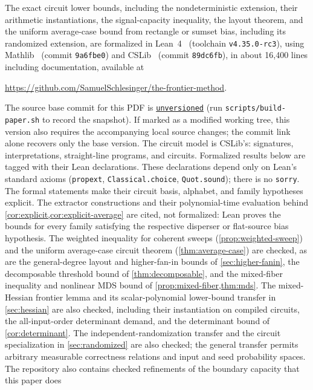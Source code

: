\documentclass[11pt]{article}
\theoremstyle{plain}
\theoremstyle{definition}
\theoremstyle{remark}
\newcommand{\artifactcommit}{main}
\newcommand{\artifactshort}{unversioned}
\newcommand{\artifactstatus}{ (run \texttt{scripts/build-paper.sh} to record the snapshot)}
\begin{document}
The exact circuit lower bounds, including the nondeterministic extension, their arithmetic
instantiations, the signal-capacity inequality, the layout theorem, and the uniform
average-case bound from rectangle or sumset bias, including its randomized extension, are
formalized in Lean~4~\cite{Lean4} (toolchain \texttt{v4.35.0-rc3}),
using Mathlib~\cite{Mathlib} (commit \texttt{9a6fbe0}) and CSLib~\cite{CSLib} (commit
\texttt{89dc6fb}), in about 16,400 lines including documentation, available at
\begin{center}
\url{https://github.com/SamuelSchlesinger/the-frontier-method}.
\end{center}
The source base commit for this PDF is
\href{https://github.com/SamuelSchlesinger/the-frontier-method/tree/\artifactcommit}{\texttt{\artifactshort}}\artifactstatus.
If marked as a modified working tree, this version also requires the accompanying local
source changes; the commit link alone recovers only the base version.
The circuit model is CSLib's: signatures, interpretations, straight-line programs, and circuits.
Formalized results below are tagged with their Lean declarations. These declarations
depend only on Lean's standard axioms (\texttt{propext},
\texttt{Classical.choice}, \texttt{Quot.sound}); there is no \texttt{sorry}. The formal
statements make their circuit basis, alphabet, and family hypotheses explicit.
The extractor constructions and their
polynomial-time evaluation behind \cref{cor:explicit,cor:explicit-average} are cited, not
formalized: Lean proves the bounds for every family satisfying the respective disperser or
flat-source bias hypothesis. The weighted inequality for coherent sweeps
(\cref{prop:weighted-sweep}) and the uniform average-case circuit theorem
(\cref{thm:average-case}) are checked, as are the general-degree layout and higher-fan-in
bounds of \cref{sec:higher-fanin}, the decomposable threshold bound of \cref{thm:decomposable},
and the mixed-fiber inequality and nonlinear MDS bound of \cref{prop:mixed-fiber,thm:mds}.
The mixed-Hessian frontier lemma and its scalar-polynomial lower-bound transfer in
\cref{sec:hessian} are also checked, including their instantiation on compiled circuits,
the all-input-order determinant demand, and the determinant bound of
\cref{cor:determinant}.
The independent-randomization transfer and the circuit specialization in
\cref{sec:randomized} are also checked; the general transfer permits arbitrary measurable
correctness relations and input and seed probability spaces.
The repository also contains checked refinements of the boundary capacity that this paper does
\end{document}
